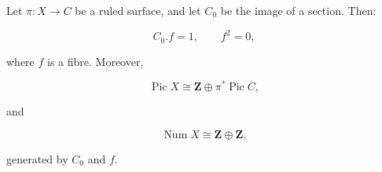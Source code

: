 Let $\pi: X \rightarrow C$ be a ruled surface, and let $C_0$ be the image of a section. Then:

$$C_0.f = 1, \qquad f^2 = 0,$$

where $f$ is a fibre. Moreover,

$$\operatorname{Pic} X \cong \mathbf{Z} \oplus \pi^*\operatorname{Pic} C,$$

and

$$\operatorname{Num} X \cong \mathbf{Z} \oplus \mathbf{Z},$$

generated by $C_0$ and $f$.
